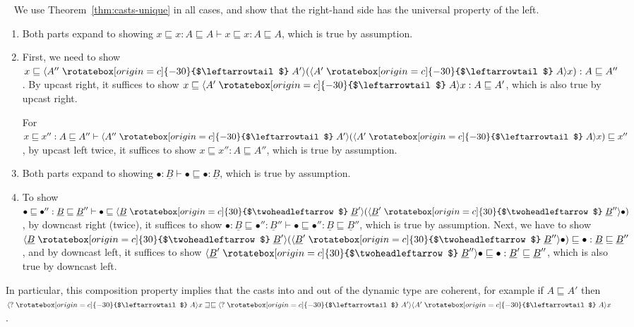 \documentclass[acmsmall,screen,12pt]{acmart}
\renewcommand{\u}{\underline}
\newcommand{\ltdyn}{\sqsubseteq}
\newcommand{\gtdyn}{\sqsupseteq}
\newcommand{\equidyn}{\mathrel{\gtdyn\ltdyn}}
\newcommand{\dynv}{{?}}
\newcommand{\uarrow}{\mathrel{\rotatebox[origin=c]{-30}{$\leftarrowtail$}}}
\newcommand{\darrow}{\mathrel{\rotatebox[origin=c]{30}{$\twoheadleftarrow$}}}
\newcommand{\upcast}[2]{\langle{#2}\uarrow{#1}\rangle}
\newcommand{\dncast}[2]{\langle{#1}\darrow{#2}\rangle}
\begin{document}
\begin{longproof} ~
We use Theorem~\ref{thm:casts-unique} in all cases, and show that the
right-hand side has the universal property of the left.   
\begin{enumerate}
\item Both parts expand to showing 
  $x \ltdyn x : A \ltdyn A \vdash x \ltdyn x : A \ltdyn A$,
  which is true by assumption.
  
\item
  First, we need to show $x \ltdyn \upcast{A'}{A''}{(\upcast A{A'} x)} :
  A \ltdyn A''$.  By upcast right, it suffices to show $x \ltdyn
  \upcast{A}{A'}{x} : A \ltdyn A'$, which is also true by upcast right.

  For $x \ltdyn x'' : A \ltdyn A'' \vdash \upcast{A'}{A''}{(\upcast
    A{A'} x)} \ltdyn x''$, by upcast left twice, it suffices to show $x
  \ltdyn x'' : A \ltdyn A''$, which is true by assumption.
  
\item Both parts expand to showing $\bullet : \u B \vdash \bullet \ltdyn
  \bullet : \u B$, which is true by assumption.

\item
  To show $\bullet \ltdyn \bullet'' : \u B \ltdyn \u B'' \vdash \bullet
  \ltdyn \dncast{\u B}{\u B'}{(\dncast{\u B'}{\u B''} \bullet)}$, by
  downcast right (twice), it suffices to show $\bullet : \u B \ltdyn
  \bullet'' : \u B'' \vdash {\bullet} \ltdyn \bullet'' : \u B \ltdyn \u
  B''$, which is true by assumption.  Next, we have to show $\dncast{\u
    B}{\u B'}{(\dncast{\u B'}{\u B''} \bullet)} \ltdyn \bullet : \u B
  \ltdyn \u B''$, and by downcast left, it suffices to show $\dncast{\u
    B'}{\u B''}{\bullet} \ltdyn \bullet : \u B' \ltdyn \u B''$, which is
  also true by downcast left.
\end{enumerate}
\end{longproof}

\noindent In particular, this composition property implies that the casts into and
out of the dynamic type are coherent, for example if $A \ltdyn A'$
then
$\upcast{A}{\dynv}{x} \equidyn \upcast{A'}{\dynv}{\upcast{A}{A'}{x}}$.  
\end{document}
